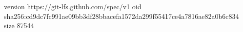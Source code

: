 version https://git-lfs.github.com/spec/v1
oid sha256:cd9dc7fc991ae09bb3df28bbacefa1572da299f55417ce4a7816ae82a0b6c834
size 87544
